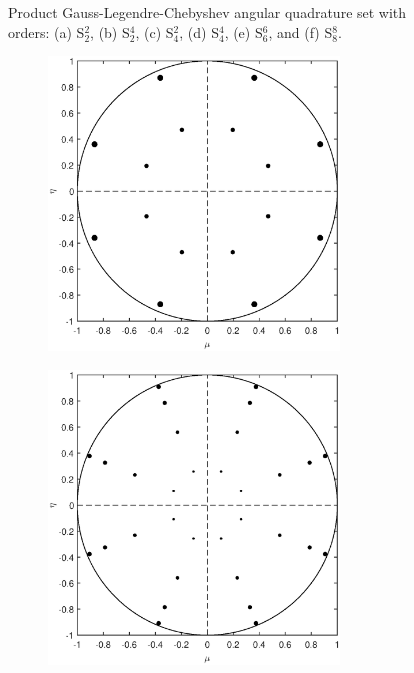\begin{figure}
\begin{subfigure}[b]{0.48\textwidth}
		\caption{}
	\end{subfigure}
\caption[3D Product Gauss-Legendre-Chebyshev angular quadrature set]{Product Gauss-Legendre-Chebyshev angular quadrature set with orders: (a) S$_2^2$, (b) S$_2^4$, (c) S$_4^2$, (d) S$_4^4$, (e) S$_6^6$, and (f) S$_8^8$.}
\label{fig::Sn_Angle_PGLC_Quads_3D}
\end{figure}

\begin{figure}
\centering
	\begin{subfigure}[b]{0.46\textwidth}
		\centering
		\includegraphics[width=0.85\textwidth]{figures/sec_Sn/PGLC2_2_2D.eps}
		\caption{}
	\end{subfigure}
	\hfill
	\begin{subfigure}[b]{0.46\textwidth}
		\centering
		\includegraphics[width=0.85\textwidth]{figures/sec_Sn/PGLC2_4_2D.eps}

\end{subfigure}
\end{figure}
